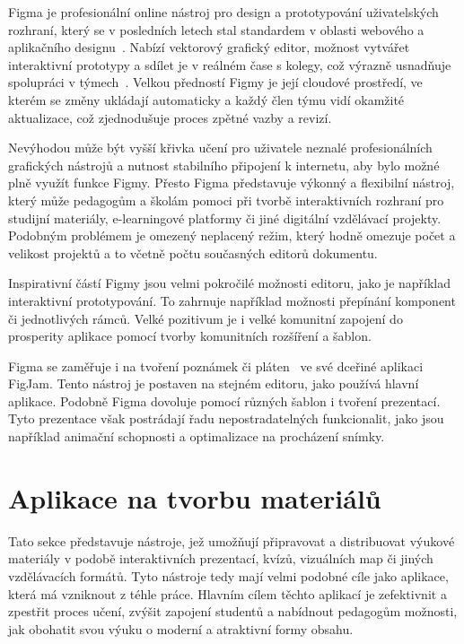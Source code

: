 Figma je profesionální online nástroj pro design a prototypování uživatelských rozhraní, který se v posledních letech stal standardem v oblasti webového a aplikačního designu~\cite{figma_website}. 
Nabízí vektorový grafický editor, možnost vytvářet interaktivní prototypy a sdílet je v reálném čase s kolegy, což výrazně usnadňuje spolupráci v týmech~\cite{figma_website}. 
Velkou předností Figmy je její cloudové prostředí, ve kterém se změny ukládají automaticky a každý člen týmu vidí okamžité aktualizace, což zjednodušuje proces zpětné vazby a revizí. 

Nevýhodou může být vyšší křivka učení pro uživatele neznalé profesionálních grafických nástrojů a nutnost stabilního připojení k internetu, aby bylo možné plně využít funkce Figmy. 
Přesto Figma představuje výkonný a flexibilní nástroj, který může pedagogům a školám pomoci při tvorbě interaktivních rozhraní pro studijní materiály, e-learningové platformy či jiné digitální vzdělávací projekty.
Podobným problémem je omezený neplacený režim, který hodně omezuje počet a velikost projektů a to včetně počtu současných editorů dokumentu.

Inspirativní částí Figmy jsou velmi pokročilé možnosti editoru, jako je například interaktivní prototypování.
To zahrnuje například možnosti přepínání komponent či jednotlivých rámců.
Velké pozitivum je i velké komunitní zapojení do prosperity aplikace pomocí tvorby komunitních rozšíření a šablon.

Figma se zaměřuje i na tvoření poznámek či pláten~\cite{figma_figjam} ve své dceřiné aplikaci FigJam.
Tento nástroj je postaven na stejném editoru, jako používá hlavní aplikace.
Podobně Figma dovoluje pomocí různých šablon i tvoření prezentací.
Tyto prezentace však postrádají řadu nepostradatelných funkcionalit, jako jsou například animační schopnosti a optimalizace na procházení snímky.

\section{Aplikace na tvorbu materiálů}\label{text:analyza/materialy}

Tato sekce představuje nástroje, jež umožňují připravovat a distribuovat výukové materiály v podobě interaktivních prezentací, kvízů, vizuálních map či jiných vzdělávacích formátů.
Tyto nástroje tedy mají velmi podobné cíle jako aplikace, která má vzniknout z téhle práce.
Hlavním cílem těchto aplikací je zefektivnit a zpestřit proces učení, zvýšit zapojení studentů a nabídnout pedagogům možnosti, jak obohatit svou výuku o moderní a atraktivní formy obsahu.

